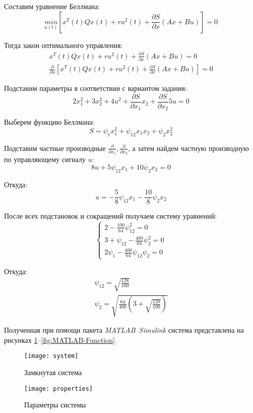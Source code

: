 \documentclass[14pt, a4paper]{extarticle}
\begin{document}
	Составим уравнение Беллмана:
	$$\underset{u(t)}{min}\left[x^T(t)Qx(t) + ru^2(t) + \frac{\partial S}{\partial x}\left(Ax + Bu\right)\right] = 0$$
	
	Тогда закон оптимального управления:
	$$\begin{matrix}
		x^T(t)Qx(t) + ru^2(t) + \frac{\partial S}{\partial x}\left(Ax + Bu\right) = 0 \\
		\frac{\partial}{\partial u}\left[x^T(t)Qx(t) + ru^2(t) + \frac{\partial S}{\partial x}\left(Ax + Bu\right)\right] = 0
	\end{matrix}$$
	
	Подставим параметры в соответствии с вариантом задания:
	$$2x_1^2 + 3x_2^2 +4u^2 + \frac{\partial S}{\partial x_1}x_2 + \frac{\partial S}{\partial x_2}5u = 0$$
	
	Выберем функцию Беллмана:
	$$S = \psi_1x_1^2 + \psi_{12}x_1x_2 + \psi_2x_2^2$$
	
	Подставим частные производные $\frac{\partial}{\partial x_1}, \frac{\partial}{\partial x_2}$, а затем найдем частную производную по управляющему сигналу $u$:
	$$8u + 5\psi_{12}x_1 + 10\psi_2x_2 = 0$$
	
	Откуда:
	$$u = -\frac{5}{8}\psi_{12}x_1 - \frac{10}{8}\psi_2x_2$$
	
	После всех подстановок и сокращений получаем систему уравнений:
	$$\begin{cases}
		2 - \frac{100}{64}\psi_{12}^2 = 0 \\
		3 + \psi_{12} - \frac{400}{64}\psi_2^2 = 0 \\
		2\psi_1 - \frac{400}{64}\psi_{12}\psi_2 = 0
	\end{cases}$$
	
	Откуда:
	$$\begin{matrix}
		\psi_{12} = \sqrt{\frac{128}{100}}\\
		\psi_2 = \sqrt{\frac{64}{400}\left(3 + \sqrt{\frac{128}{100}}\right)}
	\end{matrix}$$
	
	Полученная при помощи пакета \textit{MATLAB~Simulink} система представлена на рисунках \ref{fig:system}--\ref{fig:MATLAB-Function}.
	
	\begin{figure}[H]
		\centering
		\texttt{[image: system]}
		\caption{Замкнутая система}
		\label{fig:system}
	\end{figure}
	
	\begin{figure}[H]
		\centering
		\texttt{[image: properties]}
		\caption{Параметры системы}
		\label{fig:properties}
	\end{figure}
	
\end{document}
